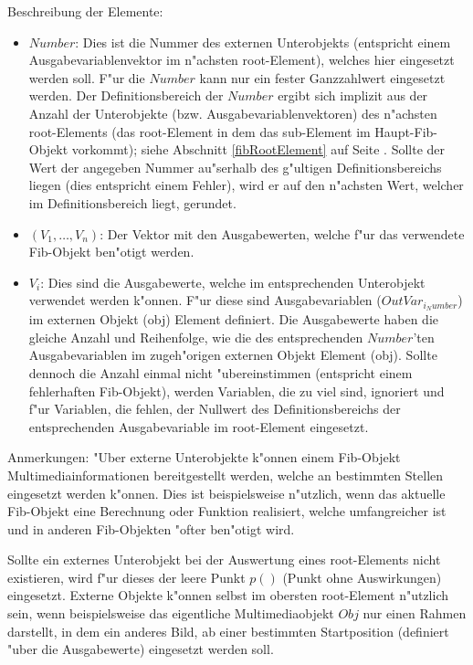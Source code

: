 \bigskip\noindent
Beschreibung der Elemente:
\begin{itemize}
 \item $Number$: Dies ist die Nummer des externen Unterobjekts (entspricht einem Ausgabevariablenvektor im n"achsten root-Element), welches hier eingesetzt werden soll. F"ur die $Number$ kann nur ein fester Ganzzahlwert eingesetzt werden. Der Definitionsbereich der $Number$ ergibt sich implizit aus der Anzahl der Unterobjekte (bzw. Ausgabevariablenvektoren) des n"achsten root-Elements (das root-Element in dem das sub-Element im Haupt-Fib-Objekt vorkommt); siehe Abschnitt \ref{fibRootElement} auf Seite \pageref{fibRootElement} . Sollte der Wert der angegeben Nummer au"serhalb des g"ultigen Definitionsbereichs liegen (dies entspricht einem Fehler), wird er auf den n"achsten Wert, welcher im Definitionsbereich liegt, gerundet.
 \item $( V_1 , \ldots , V_n )$: Der Vektor mit den Ausgabewerten, welche f"ur das verwendete Fib-Objekt ben"otigt werden.
 \item $V_i$: Dies sind die Ausgabewerte, welche im entsprechenden Unterobjekt verwendet werden k"onnen. F"ur diese sind Ausgabevariablen ($OutVar_{i_Number}$) im externen Objekt (obj) Element definiert. Die Ausgabewerte haben die gleiche Anzahl und Reihenfolge, wie die des entsprechenden $Number$'ten Ausgabevariablen im zugeh"origen externen Objekt Element (obj). Sollte dennoch die Anzahl einmal nicht "ubereinstimmen (entspricht einem fehlerhaften Fib-Objekt), werden Variablen, die zu viel sind, ignoriert und f"ur Variablen, die fehlen, der Nullwert des Definitionsbereichs der entsprechenden Ausgabevariable im root-Element eingesetzt.
\end{itemize}

\bigskip\noindent
Anmerkungen:
"Uber externe Unterobjekte k"onnen einem Fib-Objekt Multimediainformationen bereitgestellt werden, welche an bestimmten Stellen eingesetzt werden k"onnen. Dies ist beispielsweise n"utzlich, wenn das aktuelle Fib-Objekt eine Berechnung oder Funktion realisiert, welche umfangreicher ist und in anderen Fib-Objekten "ofter ben"otigt wird.

Sollte ein externes Unterobjekt bei der Auswertung eines root-Elements nicht existieren, wird f"ur dieses der leere Punkt $p()$ (Punkt ohne Auswirkungen) eingesetzt. Externe Objekte k"onnen selbst im obersten root-Element n"utzlich sein, wenn beispielsweise das eigentliche Multimediaobjekt $Obj$ nur einen Rahmen darstellt, in dem ein anderes Bild, ab einer bestimmten Startposition (definiert "uber die  Ausgabewerte) eingesetzt werden soll.

